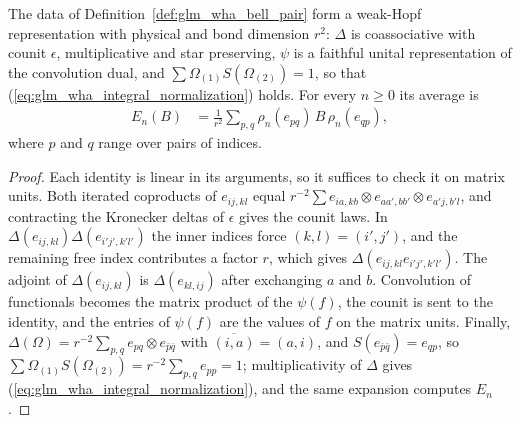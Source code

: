 \begin{lemma}
    \label{thm:glm_wha_bell_pair}
    \leanok
    The data of Definition~\ref{def:glm_wha_bell_pair} form a weak-Hopf
    representation with physical and bond dimension $r^2$: $\Delta$ is
    coassociative with counit $\epsilon$, multiplicative and star preserving,
    $\psi$ is a faithful unital representation of the convolution dual, and
    $\sum\Omega_{(1)}S(\Omega_{(2)})=1$, so that
    (\ref{eq:glm_wha_integral_normalization}) holds. For every $n\geq0$ its
    average is
    \begin{align*}
        E_n(B) & =\frac1{r^2}\sum_{p,q}\rho_n(e_{pq})\,B\,\rho_n(e_{qp}),
    \end{align*}
    where $p$ and $q$ range over pairs of indices.
\end{lemma}
\begin{proof}
    \leanok
    Each identity is linear in its arguments, so it suffices to check it on
    matrix units. Both iterated coproducts of $e_{ij,kl}$ equal
    $r^{-2}\sum e_{ia,kb}\otimes e_{aa',bb'}\otimes e_{a'j,b'l}$, and
    contracting the Kronecker deltas of $\epsilon$ gives the counit laws. In
    $\Delta(e_{ij,kl})\Delta(e_{i'j',k'l'})$ the inner indices force
    $(k,l)=(i',j')$, and the remaining free index contributes a factor $r$,
    which gives $\Delta(e_{ij,kl}e_{i'j',k'l'})$. The adjoint of
    $\Delta(e_{ij,kl})$ is $\Delta(e_{kl,ij})$ after exchanging $a$ and $b$.
    Convolution of functionals becomes the matrix product of the $\psi(f)$,
    the counit is sent to the identity, and the entries of $\psi(f)$ are the
    values of $f$ on the matrix units. Finally,
    $\Delta(\Omega)=r^{-2}\sum_{p,q}e_{pq}\otimes e_{\bar p\bar q}$ with
    $\overline{(i,a)}=(a,i)$, and $S(e_{\bar p\bar q})=e_{qp}$, so
    $\sum\Omega_{(1)}S(\Omega_{(2)})=r^{-2}\sum_{p,q}e_{pp}=1$; multiplicativity
    of $\Delta$ gives (\ref{eq:glm_wha_integral_normalization}), and the same
    expansion computes $E_n$.
\end{proof}

